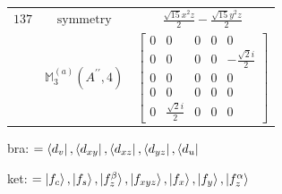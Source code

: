 \documentclass[fleqn,8pt,landscape]{jsarticle}
\begin{document}
\begin{longtable}{ccc}
$ 137 $ & $ \text{symmetry} $ & $ \frac{\sqrt{15} x^{2} z}{2} - \frac{\sqrt{15} y^{2} z}{2} $ \\
$  $ & $ \mathbb{M}_{3}^{(a)}(A^{\prime\prime},4) $ & $ \begin{bmatrix} 0 & 0 & 0 & 0 & 0 \\ 0 & 0 & 0 & 0 & - \frac{\sqrt{2} i}{2} \\ 0 & 0 & 0 & 0 & 0 \\ 0 & 0 & 0 & 0 & 0 \\ 0 & \frac{\sqrt{2} i}{2} & 0 & 0 & 0 \end{bmatrix} $ \\ \hline
\end{longtable}
bra: $=\bra{d_{v}}, \bra{d_{xy}}, \bra{d_{xz}}, \bra{d_{yz}}, \bra{d_{u}}$

\noindent
ket: $=\ket{f_{c}}, \ket{f_{s}}, \ket{f_{z}^{\beta}}, \ket{f_{xyz}}, \ket{f_{x}}, \ket{f_{y}}, \ket{f_{z}^{\alpha}}$
\renewcommand{\arraystretch}{1.6}
\end{document}
